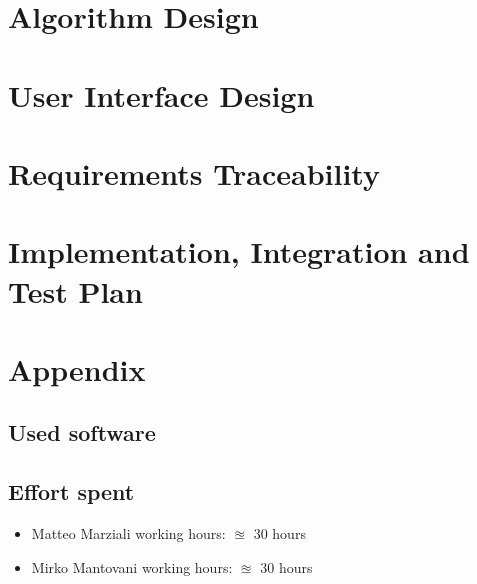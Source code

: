 \documentclass{article}
\begin{document}
\clearpage
\section{Algorithm Design}



\section{User Interface Design}


\clearpage
\section{Requirements Traceability}

\clearpage
\section{Implementation, Integration and Test Plan}



\clearpage
\section{Appendix}

\subsection{Used software}


\subsection{Effort spent}
\begin{itemize}

\item Matteo Marziali working hours:  $\approxeq$ 30 hours

\item Mirko Mantovani working hours:  $\approxeq$ 30 hours



\end{itemize}
\end{document}
